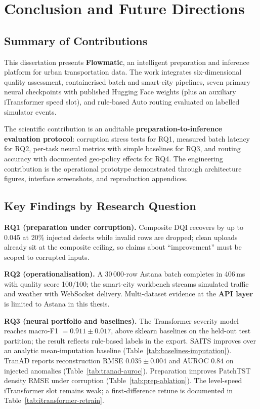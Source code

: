 %
%
\chapter{Conclusion and Future Directions}
\label{chap:conclusion}
\setlength{\parskip}{0.8em}

\section{Summary of Contributions}

This dissertation presents \textbf{Flowmatic}, an intelligent preparation and inference platform for urban transportation data. The work integrates six-dimensional quality assessment, containerised batch and smart-city pipelines, seven primary neural checkpoints with published Hugging Face weights (plus an auxiliary iTransformer speed slot), and rule-based Auto routing evaluated on labelled simulator events.

The scientific contribution is an auditable \textbf{preparation-to-inference evaluation protocol}: corruption stress tests for RQ1, measured batch latency for RQ2, per-task neural metrics with simple baselines for RQ3, and routing accuracy with documented geo-policy effects for RQ4. The engineering contribution is the operational prototype demonstrated through architecture figures, interface screenshots, and reproduction appendices.

\section{Key Findings by Research Question}

\textbf{RQ1 (preparation under corruption).} Composite DQI recovers by up to 0.045 at 20\% injected defects while invalid rows are dropped; clean uploads already sit at the composite ceiling, so claims about ``improvement'' must be scoped to corrupted inputs.

\textbf{RQ2 (operationalisation).} A 30\,000-row Astana batch completes in 406\,ms with quality score 100/100; the smart-city workbench streams simulated traffic and weather with WebSocket delivery. Multi-dataset evidence at the \textbf{API layer} is limited to Astana in this thesis.

\textbf{RQ3 (neural portfolio and baselines).} The Transformer severity model reaches macro-F1 $= 0.911 \pm 0.017$, above sklearn baselines on the held-out test partition; the result reflects rule-based labels in the export. SAITS improves over an analytic mean-imputation baseline (Table~\ref{tab:baselines-imputation}). TranAD reports reconstruction RMSE $0.035 \pm 0.004$ and AUROC $0.84$ on injected anomalies (Table~\ref{tab:tranad-auroc}). Preparation improves PatchTST density RMSE under corruption (Table~\ref{tab:prep-ablation}). The level-speed iTransformer slot remains weak; a first-difference retune is documented in Table~\ref{tab:itransformer-retrain}.

